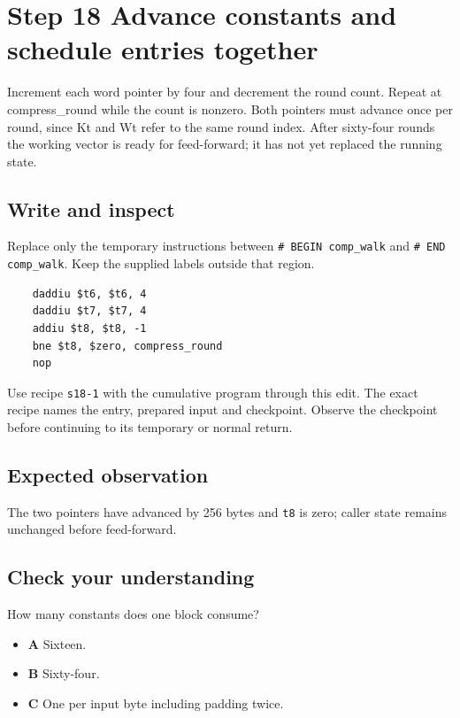\section{Step 18 Advance constants and schedule entries together}\label{sha-s18}

Increment each word pointer by four and decrement the round count. Repeat at compress\_round while the count is nonzero. Both pointers must advance once per round, since Kt and Wt refer to the same round index. After sixty-four rounds the working vector is ready for feed-forward; it has not yet replaced the running state.

\subsection{Write and inspect}
Replace only the temporary instructions between \texttt{\# BEGIN comp\_walk} and \texttt{\# END comp\_walk}. Keep the supplied labels outside that region.

\begin{verbatim}
    daddiu $t6, $t6, 4
    daddiu $t7, $t7, 4
    addiu $t8, $t8, -1
    bne $t8, $zero, compress_round
    nop
\end{verbatim}

Use recipe \texttt{s18-1} with the cumulative program through this edit. The exact recipe names the entry, prepared input and checkpoint. Observe the checkpoint before continuing to its temporary or normal return.

\subsection{Expected observation}
The two pointers have advanced by 256 bytes and \texttt{t8} is zero; caller state remains unchanged before feed-forward.

\subsection{Check your understanding}
How many constants does one block consume?

\begin{itemize}
\item \textbf{A} Sixteen.
\item \textbf{B} Sixty-four.
\item \textbf{C} One per input byte including padding twice.
\end{itemize}
